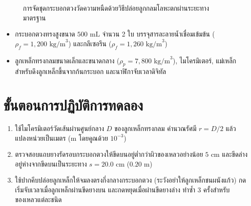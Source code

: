 \begin{figure}[H]
\centering
{}
\caption{การจัดชุดกระบอกตวงวัดความหนืดด้วยวิธีปล่อยลูกกลมโลหะตกผ่านระยะทางมาตรฐาน}
\end{figure}

\begin{equipbox}
\begin{itemize}
    \item กระบอกตวงทรงสูงขนาด $500\text{ mL}$ จำนวน 2 ใบ บรรจุสารละลายน้ำเชื่อมเข้มข้น ($\rho_f = 1{,}200\text{ kg/m}^3$) และกลีเซอรีน ($\rho_f = 1{,}260\text{ kg/m}^3$)
    \item ลูกเหล็กทรงกลมขนาดเล็กและขนาดกลาง ($\rho_p = 7{,}800\text{ kg/m}^3$), ไมโครมิเตอร์, แม่เหล็กสำหรับดึงลูกเหล็กขึ้นจากก้นกระบอก และนาฬิกาจับเวลาดิจิทัล
\end{itemize}
\end{equipbox}

\section{ขั้นตอนการปฏิบัติการทดลอง}
\begin{enumerate}
    \item ใช้ไมโครมิเตอร์วัดเส้นผ่านศูนย์กลาง $D$ ของลูกเหล็กทรงกลม คำนวณรัศมี $r = D/2$ แล้วแปลงหน่วยเป็นเมตร ($\text{m}$ โดยคูณด้วย $10^{-3}$)
    \item ตรวจสอบแถบยางรัดรอบกระบอกตวงให้ขีดบนอยู่ต่ำกว่าผิวของเหลวอย่างน้อย $5\text{ cm}$ และขีดล่างอยู่ห่างจากขีดบนเป็นระยะทาง $s = 20.0\text{ cm}$ ($0.20\text{ m}$)
    \item ใช้ปากคีบปล่อยลูกเหล็กให้จมลงตรงกึ่งกลางกระบอกตวง (ระวังอย่าให้ลูกเหล็กชนผนังแก้ว) กดเริ่มจับเวลาเมื่อลูกเหล็กผ่านขีดยางบน และกดหยุดเมื่อผ่านขีดยางล่าง ทำซ้ำ 3 ครั้งสำหรับของเหลวแต่ละชนิด
\end{enumerate}

